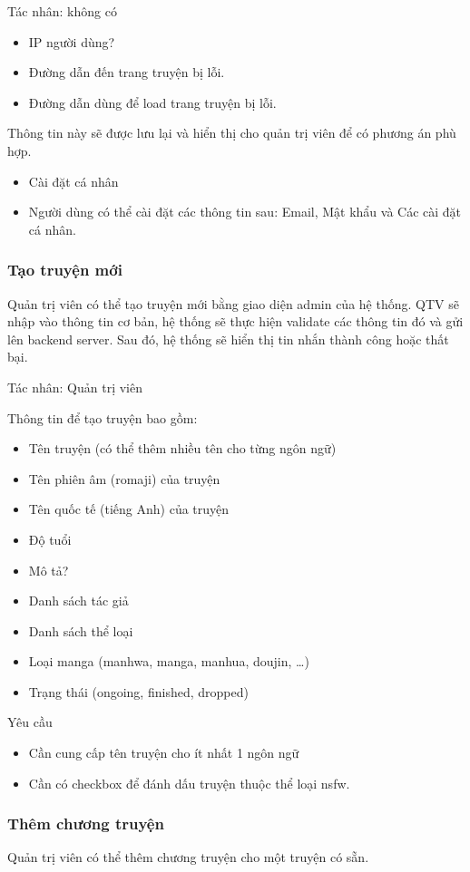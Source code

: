 \documentclass[./../main.tex]{subfiles}
\begin{document}
Tác nhân: không có
\begin{itemize}
\item IP người dùng?
\item Đường dẫn đến trang truyện bị lỗi.
\item Đường dẫn dùng để load trang truyện bị lỗi.
\end{itemize}
Thông tin này sẽ được lưu lại và hiển thị cho quản trị viên để có phương án phù hợp.
\begin{itemize}
\item Cài đặt cá nhân
\item Người dùng có thể cài đặt các thông tin sau: Email, Mật khẩu và Các cài đặt cá nhân.
\end{itemize}
\subsubsection{Tạo truyện mới}
Quản trị viên có thể tạo truyện mới bằng giao diện admin của hệ thống.
QTV sẽ nhập vào thông tin cơ bản, hệ thống sẽ thực hiện validate các thông tin đó và gửi lên backend server.
Sau đó, hệ thống sẽ hiển thị tin nhắn thành công hoặc thất bại.


Tác nhân: Quản trị viên


Thông tin để tạo truyện bao gồm:
\begin{itemize}
\item Tên truyện (có thể thêm nhiều tên cho từng ngôn ngữ)
\item Tên phiên âm (romaji) của truyện
\item Tên quốc tế (tiếng Anh) của truyện
\item Độ tuổi
\item Mô tả?
\item Danh sách tác giả
\item Danh sách thể loại
\item Loại manga (manhwa, manga, manhua, doujin, …)
\item Trạng thái (ongoing, finished, dropped)
\end{itemize}
Yêu cầu
\begin{itemize}
\item Cần cung cấp tên truyện cho ít nhất 1 ngôn ngữ
\item Cần có checkbox để đánh dấu truyện thuộc thể loại nsfw.
\end{itemize}
\subsubsection{Thêm chương truyện}
Quản trị viên có thể thêm chương truyện cho một truyện có sẵn.
\end{document}
